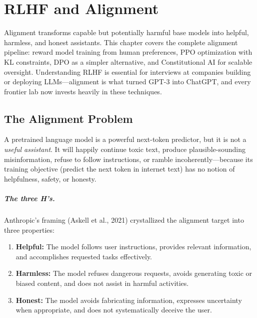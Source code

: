 
\chapter{RLHF and Alignment}
\label{chap:rlhf_alignment}

\begin{tldr}
Alignment transforms capable but potentially harmful base models into
helpful, harmless, and honest assistants.  This chapter covers the complete
alignment pipeline: reward model training from human preferences, PPO
optimization with KL constraints, DPO as a simpler alternative, and
Constitutional AI for scalable oversight.  Understanding RLHF is essential
for interviews at companies building or deploying LLMs---alignment is what
turned GPT-3 into ChatGPT, and every frontier lab now invests heavily in
these techniques.
\end{tldr}

\section{The Alignment Problem}
\label{sec:alignment_problem}

A pretrained language model is a powerful next-token predictor, but it is
not a \emph{useful assistant}.  It will happily continue toxic text, produce
plausible-sounding misinformation, refuse to follow instructions, or ramble
incoherently---because its training objective (predict the next token in
internet text) has no notion of helpfulness, safety, or honesty.

\paragraph{The three H's.}
Anthropic's framing (Askell et al., 2021) crystallized the alignment target
into three properties:

\begin{enumerate}[leftmargin=*]
\item \textbf{Helpful:} The model follows user instructions, provides
  relevant information, and accomplishes requested tasks effectively.
\item \textbf{Harmless:} The model refuses dangerous requests, avoids
  generating toxic or biased content, and does not assist in harmful
  activities.
\item \textbf{Honest:} The model avoids fabricating information, expresses
  uncertainty when appropriate, and does not systematically deceive the
  user.
\end{enumerate}

